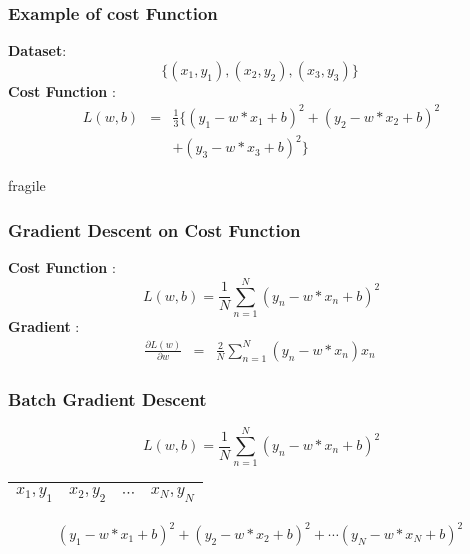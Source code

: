 \documentclass[14 pt]{beamer}
\begin{document}
\begin{frame}
  \frametitle{Example of cost Function}
\textbf{Dataset}:
  \begin{displaymath}
 \{(x_1,y_1), (x_2, y_2), (x_3, y_3)\} 
\end{displaymath}
\textbf{Cost Function} : 
\begin{displaymath}
  \begin{array}{lll}
 \ L(w,b)  & =  &  \frac{1}{3} \{(y_1 - w*x_1+b)^2 +  (y_2 - w*x_2+b)^2 
    \\
& & + (y_3 - w*x_3+b)^2 \}
  \end{array}
\end{displaymath}
\end{frame}

\begin{frame}{fragile}
  \frametitle{Gradient Descent on Cost Function}
  \textbf{Cost Function}  : 
  \begin{displaymath}
     \ L(w,b)   =  \frac{1}{N} \sum_{n=1}^{N} (y_n - w*x_n+b)^2 
   \end{displaymath}
\textbf{Gradient} :
\begin{displaymath}
\begin{array}{lll}
    \frac{\partial L(w)}{\partial w} & = &
                                           \frac{2}{N}\sum_{n=1}^N(y_n-w*x_n)x_n
\end{array}  
\end{displaymath}
 \end{frame}
 \begin{frame}[fragile]
   \frametitle{Batch Gradient Descent}
  \begin{displaymath}
     \ L(w,b)   =  \frac{1}{N} \sum_{n=1}^{N} (y_n - w*x_n+b)^2 
   \end{displaymath}
   \begin{table}
     \centering
     \begin{tabular}{|l|l|l|l|}
\hline
       $x_1, y_1$ & $x_2, y_2$ & $\cdots$ & $x_N, y_N$ \\
\hline
     \end{tabular}
   \end{table}
   \begin{displaymath}
    (y_1-w*x_1+b)^2+(y_2-w*x_2+b)^2+\cdots (y_N-w*x_N+b)^2
   \end{displaymath}
 \end{frame}
\end{document}
